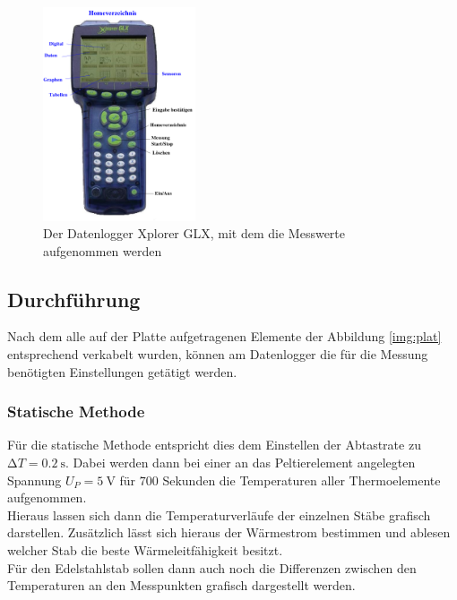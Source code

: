 \begin{figure}[ht]
    \centering
    \includegraphics[width=0.4\textwidth]{latex/images/geraet.PNG}
    \caption{Der Datenlogger Xplorer GLX, mit dem die Messwerte aufgenommen werden  \protect \cite{V204}}
  \label{fig:log}
\end{figure}

\subsection{Durchführung}

\noindent Nach dem alle auf der Platte aufgetragenen Elemente der Abbildung \ref{img:plat} entsprechend verkabelt wurden, 
können am Datenlogger die für die Messung benötigten Einstellungen getätigt werden.

\subsubsection{Statische Methode}
\noindent
Für die statische Methode entspricht dies dem Einstellen der Abtastrate zu $\increment T= \SI{0.2}{\second}$.
Dabei werden dann bei einer an das Peltierelement angelegten Spannung $U_P=\SI{5}{\volt}$ für $700$ Sekunden die Temperaturen aller Thermoelemente aufgenommen.\\
Hieraus lassen sich dann die Temperaturverläufe der einzelnen Stäbe grafisch darstellen. Zusätzlich lässt sich hieraus der Wärmestrom bestimmen und ablesen welcher Stab die beste Wärmeleitfähigkeit besitzt.\\
Für den Edelstahlstab sollen dann auch noch die Differenzen zwischen den Temperaturen an den Messpunkten grafisch dargestellt werden.

